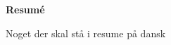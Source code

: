 \documentclass[../main.tex]{subfiles} %
\begin{document}
\clearpage %

\begin{center} %
    \textbf{\textsf{Resumé}} %
\end{center}
\vspace{1em} %

Noget der skal stå i resume på dansk
\end{document}
